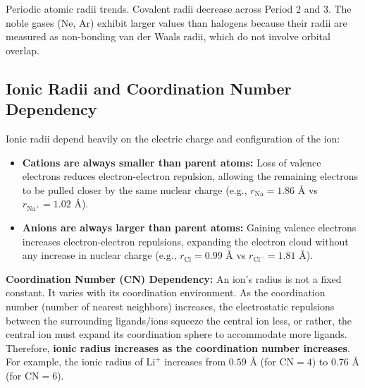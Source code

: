 \documentclass[12pt,a4paper]{article}
\begin{document}
\begin{tcolorbox}[tikzbox, title={Atomic Radii Trends Across Period 2 and Period 3}]
\begin{center}
\par\vspace{4pt}
\small\color{mydark}
Periodic atomic radii trends. Covalent radii decrease across Period 2 and 3. The noble gases (Ne, Ar) exhibit larger values than halogens because their radii are measured as non-bonding van der Waals radii, which do not involve orbital overlap.
\end{center}
\end{tcolorbox}

\subsection{Ionic Radii and Coordination Number Dependency}
Ionic radii depend heavily on the electric charge and configuration of the ion:
\begin{itemize}[leftmargin=*, itemsep=2pt]
  \item \textbf{Cations are always smaller than parent atoms:} Loss of valence electrons reduces electron-electron repulsion, allowing the remaining electrons to be pulled closer by the same nuclear charge (e.g., $r_{\text{Na}} = 1.86\text{ \AA}$ vs $r_{\text{Na}^+} = 1.02\text{ \AA}$).
  \item \textbf{Anions are always larger than parent atoms:} Gaining valence electrons increases electron-electron repulsions, expanding the electron cloud without any increase in nuclear charge (e.g., $r_{\text{Cl}} = 0.99\text{ \AA}$ vs $r_{\text{Cl}^-} = 1.81\text{ \AA}$).
\end{itemize}

\textbf{Coordination Number (CN) Dependency:}
An ion's radius is not a fixed constant. It varies with its coordination environment. As the coordination number (number of nearest neighbors) increases, the electrostatic repulsions between the surrounding ligands/ions squeeze the central ion less, or rather, the central ion must expand its coordination sphere to accommodate more ligands. Therefore, \textbf{ionic radius increases as the coordination number increases}. For example, the ionic radius of $\text{Li}^+$ increases from $0.59\text{ \AA}$ (for $\text{CN} = 4$) to $0.76\text{ \AA}$ (for $\text{CN} = 6$).
\end{document}
